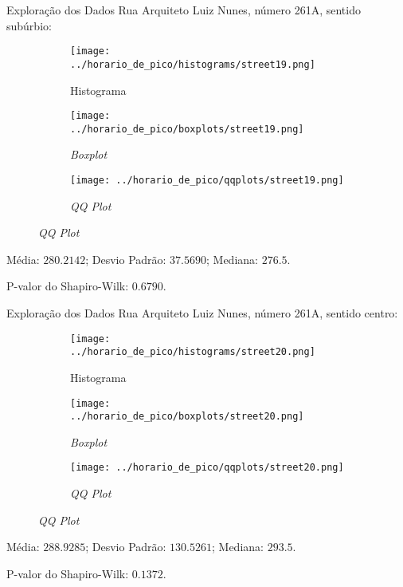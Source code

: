 \begin{frame}{Exploração dos Dados}
Rua Arquiteto Luiz Nunes, número 261A, sentido subúrbio:
\vskip 0.05cm
\begin{figure}
	\centering
	\begin{subfigure}{.33\textwidth}
		\centering
		\texttt{[image: ../horario\_de\_pico/histograms/street19.png]}
		\caption*{Histograma}
	\end{subfigure}%
	\begin{subfigure}{.33\textwidth}
		\centering
		\texttt{[image: ../horario\_de\_pico/boxplots/street19.png]}
		\caption*{\textit{Boxplot}}
	\end{subfigure}
	\begin{subfigure}{.32\textwidth}
		\centering
		\texttt{[image: ../horario\_de\_pico/qqplots/street19.png]}
		\caption*{\textit{QQ Plot}}
	\end{subfigure}
\end{figure}
\vskip 0.05cm
Média: $280.2142$; Desvio Padrão: $37.5690$; Mediana: $276.5$.

P-valor do Shapiro-Wilk: $0.6790$.
\end{frame}

\begin{frame}{Exploração dos Dados}
Rua Arquiteto Luiz Nunes, número 261A, sentido centro:
\vskip 0.05cm
\begin{figure}
	\centering
	\begin{subfigure}{.33\textwidth}
		\centering
		\texttt{[image: ../horario\_de\_pico/histograms/street20.png]}
		\caption*{Histograma}
	\end{subfigure}%
	\begin{subfigure}{.33\textwidth}
		\centering
		\texttt{[image: ../horario\_de\_pico/boxplots/street20.png]}
		\caption*{\textit{Boxplot}}
	\end{subfigure}
	\begin{subfigure}{.32\textwidth}
		\centering
		\texttt{[image: ../horario\_de\_pico/qqplots/street20.png]}
		\caption*{\textit{QQ Plot}}
	\end{subfigure}
\end{figure}
\vskip 0.05cm
Média: $288.9285$; Desvio Padrão: $130.5261$; Mediana: $293.5$.

P-valor do Shapiro-Wilk: $0.1372$.
\end{frame}

